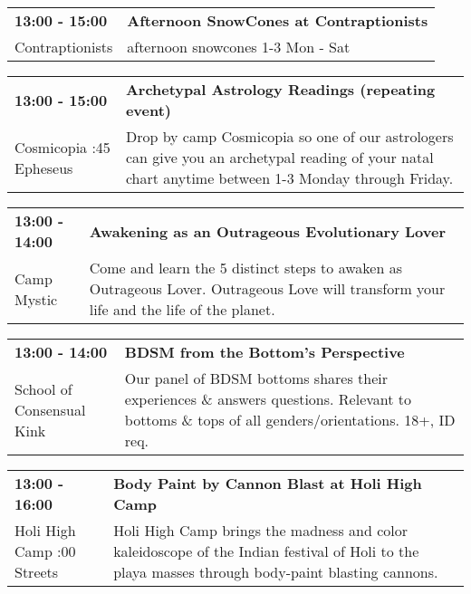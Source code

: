 \begin{tabular}{ p{1in} p{2.2in} }
    \textbf{13:00 - 15:00} & \textbf{Afternoon SnowCones at Contraptionists} \\
    Contraptionists \newline  & afternoon snowcones 1-3 Mon - Sat \\
    \hline 
\end{tabular}
    
\begin{tabular}{ p{1in} p{2.2in} }
    \textbf{13:00 - 15:00} & \textbf{Archetypal Astrology Readings (repeating event)} \\
    Cosmicopia \newline 3:45 Epheseus & Drop by camp Cosmicopia so one of our astrologers can give you an archetypal reading of your natal chart anytime between 1-3 Monday through Friday. \\
    \hline 
\end{tabular}
    
\begin{tabular}{ p{1in} p{2.2in} }
    \textbf{13:00 - 14:00} & \textbf{Awakening as an Outrageous Evolutionary Lover} \\
    Camp Mystic \newline  & Come and learn the 5 distinct steps to awaken as Outrageous Lover. Outrageous Love will transform your life and the life of the planet. \\
    \hline 
\end{tabular}
    
\begin{tabular}{ p{1in} p{2.2in} }
    \textbf{13:00 - 14:00} & \textbf{BDSM from the Bottom's Perspective} \\
    School of Consensual Kink \newline  & Our panel of BDSM bottoms shares their experiences \& answers questions. Relevant to bottoms \& tops of all genders/orientations. 18+, ID req. \\
    \hline 
\end{tabular}
    
\begin{tabular}{ p{1in} p{2.2in} }
    \textbf{13:00 - 16:00} & \textbf{Body Paint by Cannon Blast at Holi High Camp} \\
    Holi High Camp \newline 3:00 Streets & Holi High Camp brings the madness and color kaleidoscope of the Indian festival of Holi to the playa masses through body-paint blasting cannons. \\
    \hline 
\end{tabular}
    
